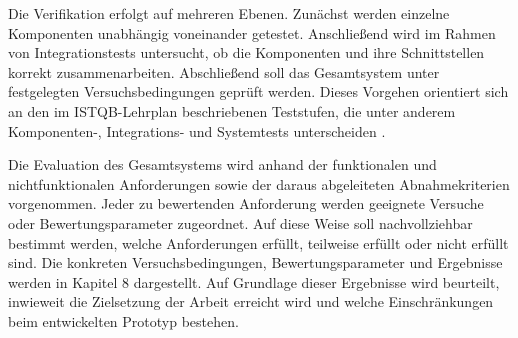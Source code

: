 Die Verifikation erfolgt auf mehreren Ebenen. Zunächst werden einzelne Komponenten unabhängig voneinander getestet. Anschließend wird im Rahmen von Integrationstests untersucht, ob die Komponenten und ihre Schnittstellen korrekt zusammenarbeiten. Abschließend soll das Gesamtsystem unter festgelegten Versuchsbedingungen geprüft werden. Dieses Vorgehen orientiert sich an den im ISTQB-Lehrplan beschriebenen Teststufen, die unter anderem Komponenten-, Integrations- und Systemtests unterscheiden \cite[S. 28--30]{ISTQBCertifiedTester}.

Die Evaluation des Gesamtsystems wird anhand der funktionalen und nichtfunktionalen Anforderungen sowie der daraus abgeleiteten Abnahmekriterien vorgenommen. Jeder zu bewertenden Anforderung werden geeignete Versuche oder Bewertungsparameter zugeordnet. Auf diese Weise soll nachvollziehbar bestimmt werden, welche Anforderungen erfüllt, teilweise erfüllt oder nicht erfüllt sind. Die konkreten Versuchsbedingungen, Bewertungsparameter und Ergebnisse werden in Kapitel 8 dargestellt. Auf Grundlage dieser Ergebnisse wird beurteilt, inwieweit die Zielsetzung der Arbeit erreicht wird und welche Einschränkungen beim entwickelten Prototyp bestehen.